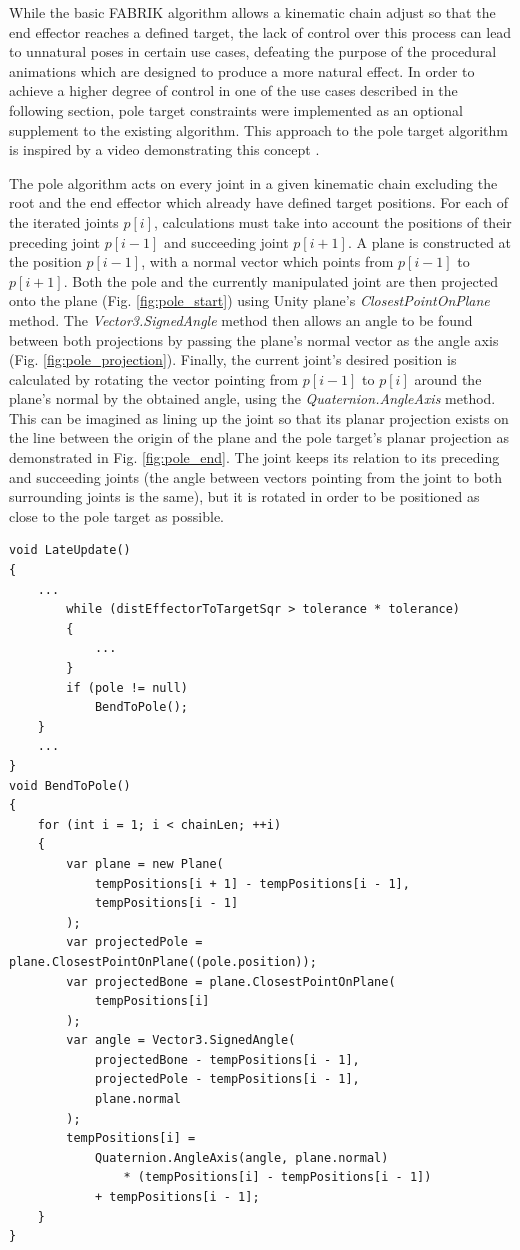 While the basic FABRIK algorithm allows a kinematic chain adjust so that the end
effector reaches a defined target, the lack of control over this process can
lead to unnatural poses in certain use cases, defeating the purpose of the
procedural animations which are designed to produce a more natural effect. In
order to achieve a higher degree of control in one of the use cases described in
the following section, pole target constraints were implemented as an optional
supplement to the existing algorithm. This approach to the pole target algorithm
is inspired by a video demonstrating this concept \cite{youtube_ik}. 

The pole algorithm acts on every joint in a given kinematic chain excluding the
root and the end effector which already have defined target positions. For each
of the iterated joints \(p[i]\), calculations must take into account the
positions of their preceding joint \(p[i-1]\) and succeeding joint \(p[i+1]\).
A plane is constructed at the position \(p[i-1]\), with a normal vector which
points from \(p[i-1]\) to \(p[i+1]\). Both the pole and the currently
manipulated joint are then projected onto the plane (Fig.
\ref{fig:pole_start}) using Unity plane's \textit{ClosestPointOnPlane} method.
The \textit{Vector3.SignedAngle} method then allows an angle to be found between
both projections by passing the plane's normal vector as the angle axis (Fig.
\ref{fig:pole_projection}). Finally, the current joint's desired position is
calculated by rotating the vector pointing from \(p[i-1]\) to \(p[i]\) around
the plane's normal by the obtained angle, using the
\textit{Quaternion.AngleAxis} method. This can be imagined as lining up the
joint so that its planar projection exists on the line between the origin of the
plane and the pole target's planar projection as demonstrated in Fig.
\ref{fig:pole_end}. The joint keeps its relation to its preceding and succeeding
joints (the angle between vectors pointing from the joint to both surrounding
joints is the same), but it is rotated in order to be positioned as close to the
pole target as possible.

\begin{lstlisting}[basicstyle=\footnotesize, numbers=none,frame=single,
caption={Pole target constraint},captionpos=b, label=poles, language={[Sharp]c},
float=tp]
void LateUpdate()
{
    ...
        while (distEffectorToTargetSqr > tolerance * tolerance)
        {
            ...
        }
        if (pole != null)
            BendToPole();
    }
    ...
}
void BendToPole()
{
    for (int i = 1; i < chainLen; ++i)
    {
        var plane = new Plane(
            tempPositions[i + 1] - tempPositions[i - 1],
            tempPositions[i - 1]
        );
        var projectedPole = plane.ClosestPointOnPlane((pole.position));
        var projectedBone = plane.ClosestPointOnPlane(
            tempPositions[i]
        );
        var angle = Vector3.SignedAngle(
            projectedBone - tempPositions[i - 1],
            projectedPole - tempPositions[i - 1],
            plane.normal
        );
        tempPositions[i] =
            Quaternion.AngleAxis(angle, plane.normal)
                * (tempPositions[i] - tempPositions[i - 1])
            + tempPositions[i - 1];
    }
}
\end{lstlisting}


